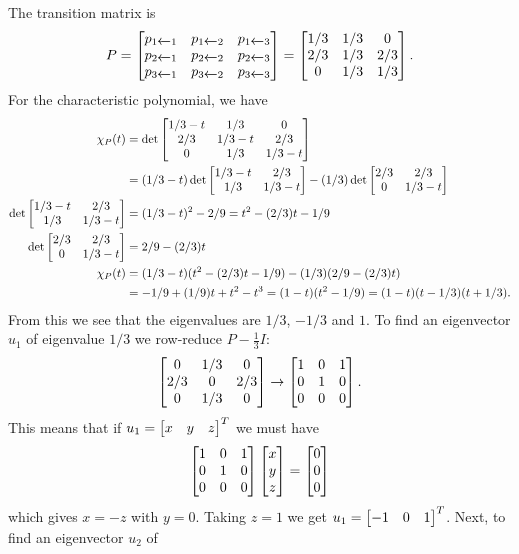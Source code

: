 \documentclass[a4paper]{amsart}
\renewenvironment{solution}{\SolutionInline}{\endSolutionInline}
\begin{document}
\begin{solution}
 The transition matrix is
 \[ P = \left[\begin{matrix} 
      p_{1\xleftarrow{}1} & p_{1\xleftarrow{}2} & p_{1\xleftarrow{}3} \\
      p_{2\xleftarrow{}1} & p_{2\xleftarrow{}2} & p_{2\xleftarrow{}3} \\
      p_{3\xleftarrow{}1} & p_{3\xleftarrow{}2} & p_{3\xleftarrow{}3} 
     \end{matrix}\right] = 
     \left[\begin{matrix} 
      1/3 & 1/3 & 0   \\
      2/3 & 1/3 & 2/3 \\
      0   & 1/3 & 1/3
     \end{matrix}\right].
 \]
 For the characteristic polynomial, we have
 \begin{align*}
   \chi_P(t) &=
     \det\left[\begin{matrix} 1/3-t & 1/3 & 0 \\
              2/3 & 1/3-t & 2/3 \\
              0 & 1/3 & 1/3-t \end{matrix}\right] \\
    &= (1/3-t)\det\left[\begin{matrix} 1/3-t & 2/3 \\ 1/3 & 1/3-t \end{matrix}\right] 
       -(1/3) \det\left[\begin{matrix} 2/3 & 2/3 \\ 0 & 1/3-t \end{matrix}\right] \\
    \det\left[\begin{matrix} 1/3-t & 2/3 \\ 1/3 & 1/3-t \end{matrix}\right] 
     &= (1/3-t)^2 - 2/9 = t^2 - (2/3)t - 1/9 \\
    \det\left[\begin{matrix} 2/3 & 2/3 \\ 0 & 1/3-t \end{matrix}\right] 
     &= 2/9 - (2/3)t \\
   \chi_P(t) &= (1/3-t)(t^2 - (2/3)t - 1/9) - (1/3)(2/9-(2/3)t)\\
     &= -1/9 + (1/9)t + t^2 -t^3 
      = (1-t)(t^2-1/9) = (1-t)(t-1/3)(t+1/3).
 \end{align*}
 From this we see that the eigenvalues are $1/3$, $-1/3$ and $1$.  To
 find an eigenvector $u_1$ of eigenvalue $1/3$ we row-reduce
 $P-\frac{1}{3}I$:
 \[ \left[\begin{matrix} 0 & 1/3 & 0 \\ 2/3 & 0 & 2/3 \\ 0 & 1/3 & 0 \end{matrix}\right] 
    \to 
    \left[\begin{matrix} 1 & 0 & 1 \\ 0 & 1 & 0 \\ 0 & 0 & 0 \end{matrix}\right].
 \]
 This means that if $u_1=\left[\begin{matrix} x&y&z\end{matrix}\right]^T$ we must have
 \[ \left[\begin{matrix} 1 & 0 & 1 \\ 0 & 1 & 0 \\ 0 & 0 & 0 \end{matrix}\right]
     \left[\begin{matrix} x \\ y \\ z\end{matrix}\right] = \left[\begin{matrix} 0 \\ 0 \\ 0 \end{matrix}\right] 
 \]
 which gives $x=-z$ with $y=0$.  Taking $z=1$ we get
 $u_1=\left[\begin{matrix} -1&0&1\end{matrix}\right]^T$.  Next, to find an eigenvector $u_2$ of

\end{solution}
\end{document}
